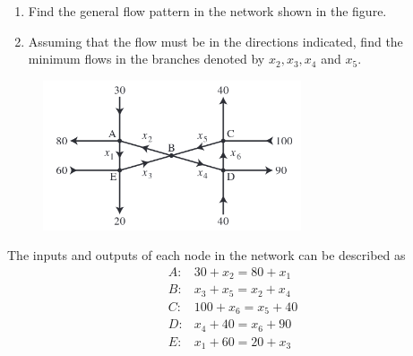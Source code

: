 \documentclass{../mathhomework}
\begin{document}
\newpage

\begin{problem}[1.6\#13]
    \begin{enumerate}[label=\alph*.]
        \item Find the general flow pattern in the network shown in the figure.
        \item Assuming that the flow must be in the directions indicated, find the minimum flows in the branches denoted by $x_2,x_3,x_4$ and $x_5$.
    \end{enumerate}

    \begin{figure}[h!]
        \begin{center}
            \includegraphics[width=3in]{figures/1_6_13.png}
        \end{center}
    \end{figure}


    \begin{solution}[Part A:]
        The inputs and outputs of each node in the network can be described as
        \begin{align*}
            A:& 30 + x_2 = 80 + x_1 \\
            B:& x_3 + x_5 = x_2 + x_4 \\
            C:& 100 + x_6 = x_5 + 40 \\
            D:& x_4 + 40 = x_6 + 90 \\
            E:& x_1 + 60 = 20 + x_3
        \end{align*}


\end{solution}
\end{problem}
\end{document}
